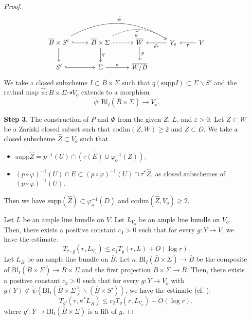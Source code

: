 \documentclass[11pt,english]{smfart}
\theoremstyle{plain}
\theoremstyle{definition}
\theoremstyle{remark}
\numberwithin{equation}{section}
\theoremstyle{plain}
\begin{document}
\begin{proof}
		
		
		
		
		
		\[
		\begin{tikzcd}
			\overline{B}\times S' \arrow[r, hookrightarrow] \arrow[d] \arrow[bend left, "\bar{\psi}"]{rrr}&	\overline{B}\times \Sigma \arrow[r, dashrightarrow]
			\arrow[dashed, bend left, "\widehat{\psi}" ']{rr}
			\arrow[d, "q"] & \overline{W} \arrow[d, "p"] & V_o\arrow[l,"\varphi_o" ] &V\arrow[l,"\tau" ] \\
			S' \arrow[r, hookrightarrow] &	\Sigma \arrow[r, "\sigma"] & \overline{W/B}& &
		\end{tikzcd}
		\]
		We take a closed subscheme $I\subset \overline{B}\times\Sigma$ such that $q(\mathrm{supp} I)\subset \Sigma\backslash S'$ and the ratinal map $\widehat{\psi}:\overline{B}\times\Sigma\dashrightarrow V_o$ extends to a morphism 
		$$\widetilde{\psi}:\mathrm{Bl}_I(\overline{B}\times\Sigma)\to V_o.$$







\textbf{Step 3.}
		The construction of $P$ and $\Phi$ from the given $Z$, $L$, and $\varepsilon > 0$.
		Let $Z\subset W$ be a Zariski closed subset such that $\mathrm{codim}(Z,W)\geq 2$ and $Z\subset D$. 
		We take a closed subscheme $\widehat{Z}\subset V_o$ such that
		\begin{itemize}
			\item
			$\mathrm{supp}\widehat{Z}=\overline{p^{-1}(U)\cap (\tau(E)\cup\varphi_o^{-1}(Z))}$,
			\item
			$(p\circ \varphi)^{-1}(U)\cap E\subset (p\circ\varphi)^{-1}(U)\cap \tau^*\widehat{Z}$, as closed subschemes of $(p\circ\varphi)^{-1}(U)$.
		\end{itemize}
		Then we have $\mathrm{supp}(\widehat{Z})\subset \varphi_o^{-1}(\overline{D})$ and $\mathrm{codim}(\widehat{Z},V_o)\geq 2$.	
		
		Let $L$ be an ample line bundle on $V$.
		Let $L_{V_o}$ be an ample line bundle on $V_o$.
		Then, there exists a positive constant $c_1>0$ such that for every $g:Y\to V$, we have the estimate:
		\begin{equation}\label{eqn:202211303}
			T_{\tau\circ g}(r,L_{V_o})\leq c_1T_g(r,L)+O(\log r).
		\end{equation}
		Let $L_{\overline{B}}$ be an ample line bundle on $\overline{B}$.
		Let $\kappa:\mathrm{Bl}_I(\overline{B}\times\Sigma)\to \overline{B}$ be the composite of $\mathrm{Bl}_I(\overline{B}\times\Sigma)\to \overline{B}\times\Sigma$ and the first projection $\overline{B}\times\Sigma\to\overline{B}$.
		Then, there exists a positive constant $c_2>0$ such that for every $g:Y\to V_o$ with $g(Y)\not\subset \widetilde{\psi}(\mathrm{Bl}_I(\overline{B}\times\Sigma)\backslash (\overline{B}\times S'))$, we have the estimate (cf. \cite[Lemma 1]{Yam15}):
		\begin{equation}\label{eqn:202211304}
			T_{g'}(r,\kappa^*L_{\overline{B}})\leq c_2T_g(r,L_{V_o})+O(\log r),
		\end{equation}
		where $g':Y\to \mathrm{Bl}_I(\overline{B}\times\Sigma)$ is a lift of $g$.
		

\end{proof}
\end{document}
